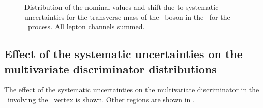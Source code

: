 \begin{figure}[htbp]
{	}
	\caption{Distribution of the nominal values and shift due to  systematic uncertainties for the transverse mass of the \PW\ boson in the \WZCR\ for the \WZ\ process. All lepton channels summed.}
	\label{fig:shiftMTW}
\end{figure}
\newpage
\subsection{Effect of the systematic uncertainties on the multivariate discriminator distributions}
\label{sec:BDTsys}
The  effect of the systematic uncertainties on the multivariate discriminator in the \STSR\ involving the \Zut\ vertex is shown. Other regions are shown in . 


